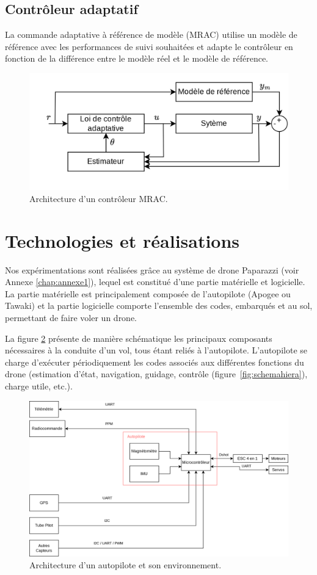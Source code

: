 \subsection*{Contrôleur adaptatif}
La commande adaptative à référence de modèle (MRAC) utilise un modèle de référence avec les performances de suivi souhaitées et adapte le contrôleur en fonction de la différence entre le modèle réel et le modèle de référence.

\begin{figure}[ht!]
    \centerline{
    \includegraphics[trim=0cm 0cm 0cm 0cm,clip,width=0.5\columnwidth]{figures/Mrac.png}}
    \caption{Architecture d'un contrôleur MRAC.}
    \label{fig:schemaMRAC}
\end{figure}

\section{Technologies et réalisations}

Nos expérimentations sont réalisées grâce au système de drone Paparazzi (voir Annexe \ref{chap:annexe1}), lequel est constitué d'une partie matérielle et logicielle. La partie matérielle est principalement composée de l'autopilote (Apogee ou Tawaki) et la partie logicielle comporte l'ensemble des codes, embarqués et au sol, permettant de faire voler un drone. 

La figure \ref{fig:schemaComposent} présente de manière schématique les principaux composants nécessaires à la conduite d'un vol, tous étant reliés à l'autopilote. L'autopilote se charge d'exécuter périodiquement les codes associés aux différentes fonctions du drone (estimation d'état, navigation, guidage, contrôle (figure~\ref{fig:schemahiera}), charge utile, etc.).

\begin{figure}[ht!]
    \centerline{
    \includegraphics[trim=0cm 0cm 0cm 0cm,clip,width=0.5\columnwidth]{figures/arch_materiel.png}}
    \caption{Architecture d'un autopilote et son environnement.}
    \label{fig:schemaComposent}
\end{figure}


